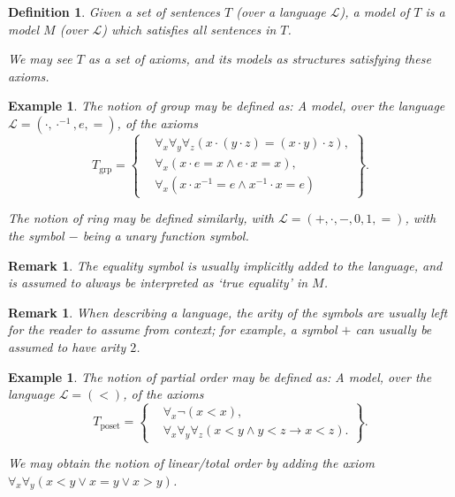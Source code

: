 \documentclass{article}
\newtheorem{remark}[theorem]{Remark}
\newtheorem{example}[theorem]{Example}
\newtheorem{definition}[theorem]{Definition}
\theoremstyle{nonumberplain}
\newcommand{\Lang}{\mathcal{L}}
\begin{document}
\begin{definition}
Given a set of sentences $T$ (over a language $\Lang$), a \emph{model of $T$} is a model $M$ (over $\Lang$) which satisfies all sentences in $T$.

We may see $T$ as a set of axioms, and its models as structures satisfying these axioms.
\end{definition}

\begin{example}\label{ex:1}
The notion of group may be defined as: A model, over the language $\Lang = (\cdot, \cdot^{-1}, e, =)$, of the axioms
\begin{equation}
T_{\text{grp}} = \left\{
\begin{aligned}
&\forall_x \forall_y \forall_z (x \cdot (y \cdot z) = (x \cdot y) \cdot z),\\
&\forall_x (x \cdot e = x \land e \cdot x = x),\\
&\forall_x (x \cdot x^{-1} = e \land x^{-1} \cdot x = e)
\end{aligned}\right\}.
\end{equation}

The notion of ring may be defined similarly, with $\Lang = (+,\cdot,-,0,1, =)$, with the symbol $-$ being a unary function symbol.
\end{example}

\begin{remark}
The equality symbol is usually implicitly added to the language, and is assumed to always be interpreted as `true equality' in $M$.
\end{remark}

\begin{remark}
When describing a language, the arity of the symbols are usually left for the reader to assume from context; for example, a symbol $+$ can usually be assumed to have arity $2$.
\end{remark}

\begin{example}
The notion of partial order may be defined as: A model, over the language $\Lang = (<)$, of the axioms
\begin{equation}
T_{\text{poset}} = \left\{
\begin{aligned}
&\forall_x \neg(x<x),\\
&\forall_x \forall_y \forall_z (x < y \land y < z \rightarrow x<z).
\end{aligned}\right\}.
\end{equation}

We may obtain the notion of linear/total order by adding the axiom $\forall_x \forall_y (x<y \lor x=y \lor x>y)$.
\end{example}
\end{document}
